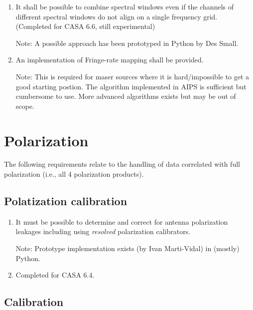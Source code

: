 \documentclass[11pt,a4paper]{article}
\begin{document}
\begin{enumerate}[subseclist]
\item It shall be possible to combine spectral windows even if the
  channels of different spectral windows do not align on a single
  frequency grid.  (Completed for CASA 6.6, still experimental)

  Note: A possible approach has been prototyped in Python by Des Small.

\item An implementation of Fringe-rate mapping shall be provided.

  Note: This is required for maser sources where it is hard/impossible
  to get a good starting postion.  The algorithm implemented in AIPS
  is sufficient but cumbersome to use.  More advanced algorithms
  exists but may be out of scope.

\end{enumerate}


\section{Polarization}

The following requirements relate to the handling of data correlated
with full polarization (i.e., all 4 polarization products).

\subsection{ Polatization calibration}

\begin{enumerate}[subseclist]

\item It must be possible to determine and correct for antenna
  polarization leakages including using \emph{resolved} polarization
  calibrators.

  Note: Prototype implementation exists (by Ivan Marti-Vidal) in
  (mostly) Python.

\item Completed for CASA 6.4.

\end{enumerate}


\subsection{Calibration}
\end{document}
